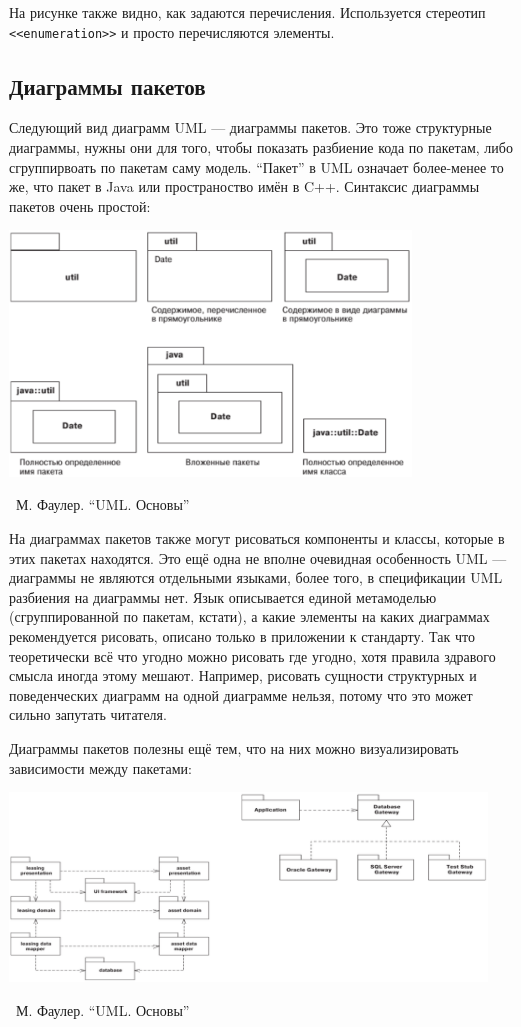 \documentclass[a5paper]{article}
\newcommand{\attribution}[1] {
	\vspace{-5mm}\begin{flushright}\begin{scriptsize}%
	{\textcopyright\, #1}\end{scriptsize}\end{flushright}
}
\begin{document}
На рисунке также видно, как задаются перечисления. Используется стереотип \verb|<<enumeration>>| и просто перечисляются элементы.

\subsection{Диаграммы пакетов}

Следующий вид диаграмм UML --- диаграммы пакетов. Это тоже структурные диаграммы, нужны они для того, чтобы показать разбиение кода по пакетам, либо сгруппирвоать по пакетам саму модель. ``Пакет'' в UML означает более-менее то же, что пакет в Java или пространоство имён в C++. Синтаксис диаграммы пакетов очень простой:

\begin{center}
	\includegraphics[width=0.8\textwidth]{packageDiagrams.png}
	\attribution{М. Фаулер. ``UML. Основы''}
\end{center}

На диаграммах пакетов также могут рисоваться компоненты и классы, которые в этих пакетах находятся. Это ещё одна не вполне очевидная особенность UML --- диаграммы не являются отдельными языками, более того, в спецификации UML разбиения на диаграммы нет. Язык описывается единой метамоделью (сгруппированной по пакетам, кстати), а какие элементы на каких диаграммах рекомендуется рисовать, описано только в приложении к стандарту. Так что теоретически всё что угодно можно рисовать где угодно, хотя правила здравого смысла иногда этому мешают. Например, рисовать сущности структурных и поведенческих диаграмм на одной диаграмме нельзя, потому что это может сильно запутать читателя.

Диаграммы пакетов полезны ещё тем, что на них можно визуализировать зависимости между пакетами:

\begin{center}
	\includegraphics[width=0.95\textwidth]{packageDependencies.png}
	\attribution{М. Фаулер. ``UML. Основы''}
\end{center}
\end{document}
